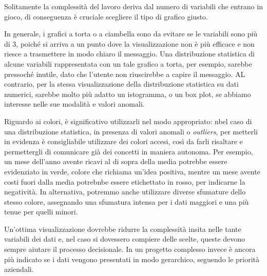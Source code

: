 Solitamente la complessità del lavoro deriva dal numero di variabili che entrano in gioco, di conseguenza è cruciale scegliere il tipo di grafico giusto.

In generale, i grafici a torta o a ciambella sono da evitare se le variabili sono più di 3, poiché si arriva a un punto dove la visualizzazione non è più efficace e non riesce a trasmettere in modo chiaro il messaggio. Una distribuzione statistica di alcune variabili rappresentata con un tale grafico a torta, per esempio, sarebbe pressoché inutile, dato che l'utente non riuscirebbe a capire il messaggio. AL contrario, per la stessa visualizzazione della distribuzione statistica su dati numerici, sarebbe molto più adatto un istogramma, o un box plot, se abbiamo interesse nelle sue modalità e valori anomali.

Riguardo ai colori, è significativo utilizzarli nel modo appropriato: nbel caso di una distribuzione statistica, in presenza di valori anomali o \textit{outliers}, per metterli in evidenza è consigliabile utilizzare dei colori accesi, così da farli risaltare e permettergli di comunicare già dei concetti in maniera autonoma. Per esempio, un mese dell'anno avente ricavi al di sopra della media potrebbe essere evidenziato in verde, colore che richiama un'idea positiva, mentre un mese avente costi fuori dalla media potrebnbe essere etichettato in rosso, per indicarne la negatività. In alternativa, potremmo anche utilizzare diverse sfumature dello stesso colore, assegnando una sfumatura intensa per i dati maggiori e una più tenue per quelli minori.

Un'ottima visualizzazione dovrebbe ridurre la complessità insita nelle tante variabili dei dati e, nel caso si dovessero compiere delle scelte, queste devono sempre aiutare il processo decisionale. In un progetto complesso invece è ancora più indicato se i dati vengono presentati in modo gerarchico, seguendo le priorità aziendali.

